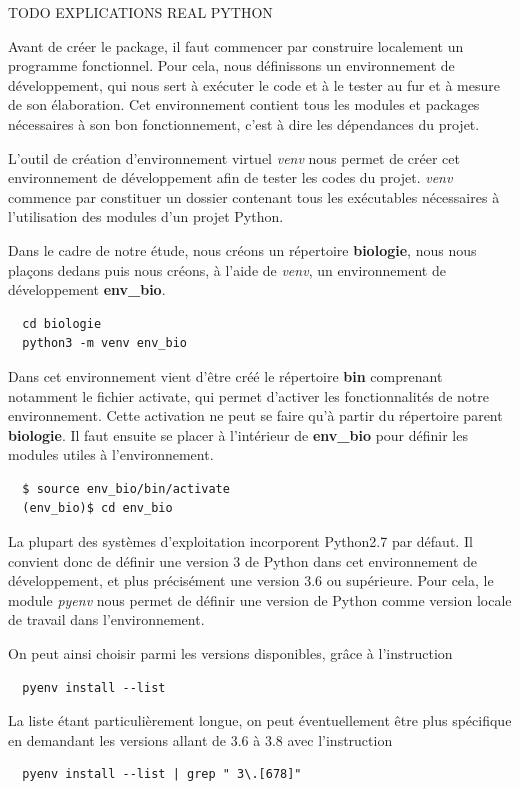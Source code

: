 \documentclass[twoside,a4paper,11pt,frenchb,openany]{report}
\begin{document}
TODO EXPLICATIONS REAL PYTHON

Avant de créer le package, il faut commencer par construire localement un programme fonctionnel. Pour cela, nous définissons un environnement de développement, qui nous sert à exécuter le code et à le tester au fur et à mesure de son élaboration. Cet environnement contient tous les modules et packages nécessaires à son bon fonctionnement, c'est à dire les dépendances du projet.
 
L'outil de création d'environnement virtuel \textit{venv} nous permet de créer cet environnement de développement afin de tester les codes du projet. \textit{venv} commence par constituer un dossier contenant tous les exécutables nécessaires à l'utilisation des modules d'un projet Python. 

Dans le cadre de notre étude, nous créons un répertoire \textbf{biologie}, nous nous plaçons dedans puis nous créons, à l'aide de \textit{venv}, un environnement de développement \textbf{env\_bio}. 
\begin{verbatim}  cd biologie
  python3 -m venv env_bio\end{verbatim}

Dans cet environnement vient d'être créé le répertoire \textbf{bin} comprenant notamment le fichier activate, qui permet d'activer les fonctionnalités de notre environnement.
Cette activation ne peut se faire qu'à partir du répertoire parent \textbf{biologie}. Il faut ensuite se placer à l'intérieur de \textbf{env\_bio} pour définir les modules utiles à l'environnement. 
 \begin{verbatim}  $ source env_bio/bin/activate
  (env_bio)$ cd env_bio\end{verbatim}

La plupart des systèmes d'exploitation incorporent Python2.7 par défaut. Il convient donc de définir une version 3 de Python dans cet environnement de développement, et plus précisément une version 3.6 ou supérieure. Pour cela, le module \textit{pyenv}  nous permet de définir une version de Python comme version locale de travail dans l'environnement. 

On peut ainsi choisir parmi les versions disponibles, grâce à l'instruction
\begin{verbatim}  pyenv install --list\end{verbatim}
La liste étant particulièrement longue, on peut éventuellement être plus spécifique en demandant les versions allant de 3.6 à 3.8 avec l'instruction
\begin{verbatim}  pyenv install --list | grep " 3\.[678]"\end{verbatim}
\end{document}
